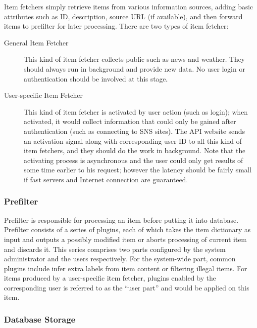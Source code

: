 Item fetchers simply retrieve items from various information sources,
adding basic attributes such as ID, description, source URL (if
available), and then forward items to prefilter for later processing.
There are two types of item fetcher:

\begin{description}
\item[General Item Fetcher]\hfill

  This kind of item fetcher collects public
 such as news and weather. They should always run in
  background and provide new data. No user login or authentication
  should be involved at this stage.
\item[User-specific Item Fetcher] \hfill

  This kind of item fetcher is activated by
  user action (such as login); when activated, it would collect
  information that could only be gained after authentication (such as
  connecting to SNS sites). The API website sends an activation signal
  along with corresponding user ID to all this kind of item fetchers,
  and they should do the work in background. Note that the activating
  process is asynchronous and the user could only get results of some
  time earlier to his request; however the latency should be fairly
  small if fast servers and Internet connection are guaranteed.
\end{description}

\subsubsection{Prefilter}

Prefilter is responsible for processing an item before putting it into
database. Prefilter consists of a series of plugins, each of which takes
the item dictionary as input and outputs a possibly modified item or
aborts processing of current item and discards it. This series comprises
two parts configured by the system administrator and the users
respectively. For the system-wide part, common plugins include infer
extra labels from item content or filtering illegal items. For items
produced by a user-specific item fetcher, plugins enabled by the
corresponding user is referred to as the ``user part'' and would be
applied on this item.

\subsubsection{Database Storage}

